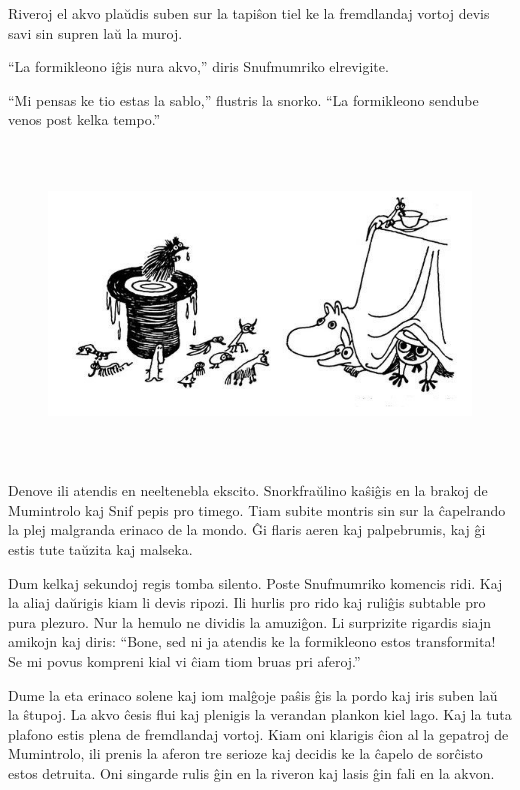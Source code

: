 Riveroj el akvo plaŭdis suben sur la tapiŝon tiel ke la fremdlandaj vortoj devis savi sin supren laŭ la muroj.

``La formikleono iĝis nura akvo,'' diris Snufmumriko elrevigite.

``Mi pensas ke tio estas la sablo,'' flustris la snorko. ``La formikleono sendube venos post kelka tempo.''

\begin{figure}[htbp]
\centering
\includegraphics[width=450pt,height=239pt]{_10.jpg}
\caption{}
\label{_10}
\end{figure}

Denove ili atendis en neeltenebla ekscito. Snorkfraŭlino kaŝiĝis en la brakoj de Mumintrolo kaj Snif pepis pro timego. Tiam subite montris sin sur la ĉapelrando la plej malgranda erinaco de la mondo. Ĝi flaris aeren kaj palpebrumis, kaj ĝi estis tute taŭzita kaj malseka.

Dum kelkaj sekundoj regis tomba silento. Poste Snufmumriko komencis ridi. Kaj la aliaj daŭrigis kiam li devis ripozi. Ili hurlis pro rido kaj ruliĝis subtable pro pura plezuro. Nur la hemulo ne dividis la amuziĝon. Li surprizite rigardis siajn amikojn kaj diris: ``Bone, sed ni ja atendis ke la formikleono estos transformita! Se mi povus kompreni kial vi ĉiam tiom bruas pri aferoj.''

Dume la eta erinaco solene kaj iom malĝoje paŝis ĝis la pordo kaj iris suben laŭ la ŝtupoj. La akvo ĉesis flui kaj plenigis la verandan plankon kiel lago. Kaj la tuta plafono estis plena de fremdlandaj vortoj.
\sectionbreak
Kiam oni klarigis ĉion al la gepatroj de Mumintrolo, ili prenis la aferon tre serioze kaj decidis ke la ĉapelo de sorĉisto estos detruita. Oni singarde rulis ĝin en la riveron kaj lasis ĝin fali en la akvon.

